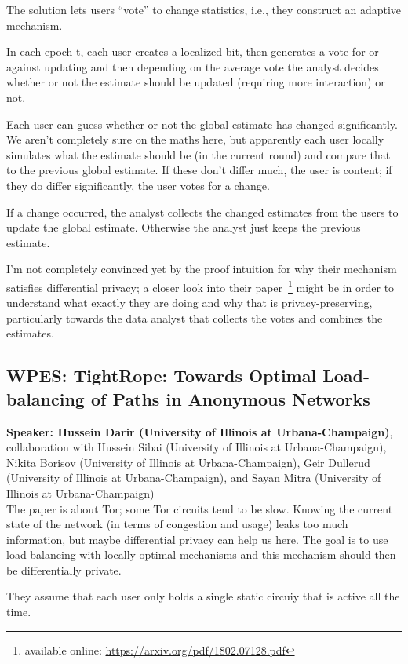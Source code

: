 \documentclass{article}
\begin{document}
The solution lets users “vote” to change statistics, i.e., they construct an adaptive mechanism.


In each epoch t, each user creates a localized bit, then generates a vote for or against updating and then depending on the average vote the analyst decides whether or not the estimate should be updated (requiring more interaction) or not.

Each user can guess whether or not the global estimate has changed significantly. We aren’t completely sure on the maths here, but apparently each user locally simulates what the estimate should be (in the current round) and compare that to the previous global estimate. If these don’t differ much, the user is content; if they do differ significantly, the user votes for a change.

If a change occurred, the analyst collects the changed estimates from the users to update the global estimate. Otherwise the analyst just keeps the previous estimate.

I’m not completely convinced yet by the proof intuition for why their mechanism satisfies differential privacy; a closer look into their paper~\footnote{available online: \url{https://arxiv.org/pdf/1802.07128.pdf}} might be in order to understand what exactly they are doing and why that is privacy-preserving, particularly towards the data analyst that collects the votes and combines the estimates.


\subsection{WPES: TightRope: Towards Optimal Load-balancing of Paths in Anonymous Networks}
\noindent\textbf{Speaker: Hussein Darir (University of Illinois at Urbana-Champaign)}, collaboration with Hussein Sibai (University of Illinois at Urbana-Champaign), Nikita Borisov (University of Illinois at Urbana-Champaign), Geir Dullerud (University of Illinois at Urbana-Champaign), and Sayan Mitra (University of Illinois at Urbana-Champaign)\\

The paper is about Tor; some Tor circuits tend to be slow. Knowing the current state of the network (in terms of congestion and usage) leaks too much information, but maybe differential privacy can help us here. The goal is to use load balancing with locally optimal mechanisms and this mechanism should then be differentially private.

They assume that each user only holds a single static circuiy that is active all the time. 
\end{document}
